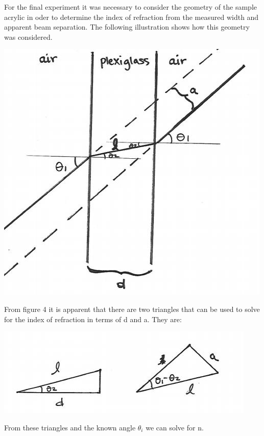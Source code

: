 \documentclass[letter, 11pt, onecolumn]{article}
\begin{document}
\noindent For the final experiment it was necessary to consider the geometry of the sample acrylic in oder to determine the index of refraction from the measured width and apparent beam separation. The following illustration shows how this geometry was considered.\\
	\begin{center}
		\includegraphics[scale=.35]{plexiglass}
	\end{center}
\noindent From figure 4 it is apparent that there are two triangles that can be used to solve for the index of refraction in terms of d and a. They are: \\
	\begin{center}
		\includegraphics[scale=.35]{triangles}
	\end{center}
From these triangles and the known angle $\theta_i$ we can solve for n. 
\end{document}
